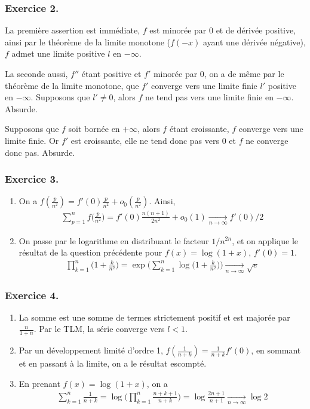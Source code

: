 \documentclass{article}
\begin{document}
\subsubsection*{Exercice 2.}
La première assertion est immédiate, $f$ est minorée par $0$ et de dérivée positive, ainsi par le théorème de la limite monotone ($f(-x)$ ayant une dérivée négative), $f$ admet une limite positive $l$ en $-\infty$.

La seconde aussi, $f''$ étant positive et $f'$ minorée par $0$, on a de même par le théorème de la limite monotone, que $f'$ converge vers une limite finie $l'$ positive en $-\infty$. Supposons que $l'\neq 0$, alors $f$ ne tend pas vers une limite finie en $-\infty$. Absurde. 

Supposons que $f$ soit bornée en $+\infty$, alors $f$ étant croissante, $f$ converge vers une limite finie. Or $f'$ est croissante, elle ne tend donc pas vers $0$ et $f$ ne converge donc pas. Absurde. 

\subsubsection*{Exercice 3.}
\begin{enumerate}
\item On a $f(\frac{p}{n^2})=f'(0)\frac{p}{n^2}+o_{0}(\frac{p}{n^2})$. Ainsi,
\begin{align*}
\sum_{p=1}^{n}f\bigg(\frac{p}{n^2}\bigg)=f'(0)\frac{n(n+1)}{2n^2}+o_{0}(1)\xrightarrow[n\to\infty]{} f'(0)/2
\end{align*}

\item On passe par le logarithme en distribuant le facteur $1/n^{2n}$, et on applique le résultat de la question précédente pour $f(x) = \log{(1+x)}$, $f'(0)=1$.
\begin{align*}
\prod_{k=1}^{n}{\bigg( 1+\frac{k}{n^2}\bigg)}=\exp \bigg( \sum_{k=1}^n \log\bigg({1+\frac{k}{n^2}}\bigg) \bigg)\xrightarrow[n\to\infty]{}  \sqrt{e}
\end{align*}
\end{enumerate}
\subsubsection*{Exercice 4.}
\begin{enumerate}
\item La somme est une somme de termes strictement positif et est majorée par $\frac{n}{1+n}$. Par le TLM, la série converge vers $l < 1$.
\item Par un développement limité d'ordre 1, $f(\frac{1}{n+k})=\frac{1}{n+k}f'(0)$, en sommant et en passant à la limite, on a le résultat escompté.
\item En prenant $f(x)=\log(1+x)$, on a
\begin{align*}
\sum_{k=1}^{n} \frac{1}{n+k} = \log \bigg(\prod_{k=1}^{n}{\frac{n+k+1}{n+k}}\bigg)=\log \frac{2n+1}{n+1}\xrightarrow[n\to\infty]{} \log 2
\end{align*}
\end{enumerate}
\end{document}
